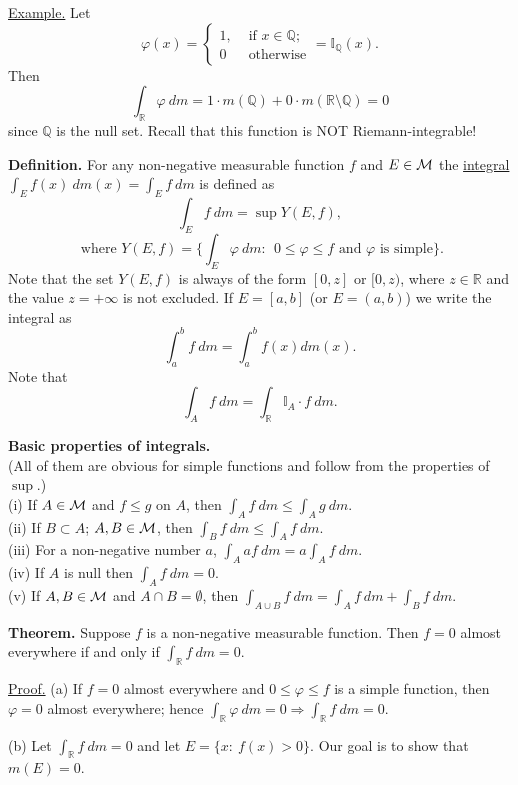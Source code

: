 \documentclass[a4paper,10pt]{article}
\def\RR{\mathbb{R}}
\def\QQ{\mathbb{Q}}
\def\II{\mathbb{I}}
\newcommand{\1}[1]{\mathbf{1}_{\{#1\}}}
\begin{document}
\underline{Example.} Let
  $$\varphi(x)=\left\{\begin{array}{ll} 1, & \mbox{ if } x\in\QQ; \\ 0 & \mbox{ otherwise} \end{array}\right. = \II_{\QQ}(x).$$
Then
  $$\int_\RR\varphi~ dm=1\cdot m(\QQ)+0\cdot m(\RR\setminus\QQ)=0$$
since $\QQ$ is the null set. Recall that this function is NOT Riemann-integrable!

{\bf Definition.} For any non-negative measurable function $f$ and $E\in{\cal M}$ the \underline{integral} $\displaystyle\int_E f(x)~dm(x)=\int_E f~dm$ is defined as
  $$\int_E f~dm=\sup Y(E,f),$$
    $$ \mbox{ where } Y(E,f)=\{\int_E\varphi~dm:~~0\le\varphi\le f \mbox{ and } \varphi \mbox{ is simple} \}.$$
Note that the set $Y(E,f)$ is always of the form $[0,z]$ or $[0,z)$, where $z\in\RR$ and the value $z=+\infty$ is not excluded.
If $E=[a,b]$ (or $E=(a,b)$) we write the integral as
  $$\int_a^b f~dm=\int_a^b f(x) dm(x).$$
Note that
  $$\int_A f~dm=\int_{\RR} \II_A\cdot f~dm.$$
\vspace{3mm}

{\bf Basic properties of integrals.}\\
(All of them are obvious for simple functions and follow from the properties of $\sup$.)
\vspace{3mm}\\
(i) If $A\in{\cal M}$ and $f\le g$ on $A$, then $\displaystyle \int_A f~dm\le\int_A g~dm.$\\
(ii) If $B\subset A$; $A,B\in{\cal M}$, then $\displaystyle\int_B f~dm\le \int_A f~dm$.\\
(iii) For a non-negative number $a$, $\displaystyle\int_A af~dm=a\int_A f~dm$.\\
(iv) If $A$ is null then $\displaystyle\int_A f~dm=0$.\\
(v) If $A,B\in{\cal M}$ and $A\cap B=\emptyset$, then $\displaystyle\int_{A\cup B}f~dm=\int_A f~dm+\int_B f~dm$.\vspace{5mm}

{\bf Theorem.} Suppose $f$ is a non-negative measurable function. Then $f=0$ almost everywhere if and only if $\displaystyle\int_{\RR} f~dm=0$.\vspace{3mm}

\underline{Proof.} (a) If $f=0$ almost everywhere and $0\le\varphi\le f$ is a simple function, then $\varphi=0$ almost everywhere; hence $\int_\RR \varphi~dm=0\Rightarrow \int_\RR f~dm=0$.

(b) Let $\int_\RR f~dm=0$ and let $E=\{x:~f(x)>0\}$. Our goal is to show that $m(E)=0$.
\end{document}
